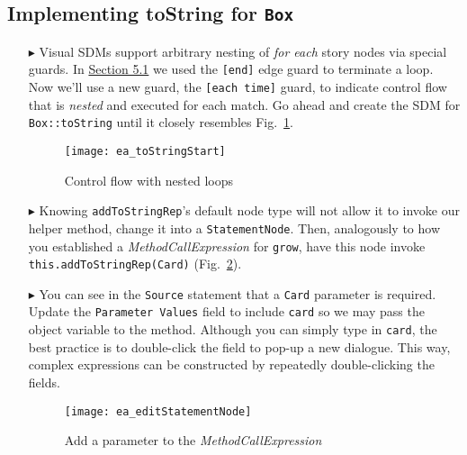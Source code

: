 \newpage
\hypertarget{stringRep vis}{}
\subsection{Implementing toString for \texttt{Box}}
\visHeader

\begin{itemize}

\item[$\blacktriangleright$] Visual SDMs support arbitrary nesting of \emph{for each} story nodes via special guards. In \hyperlink{emptyPartition vis}{Section
5.1} we used the \texttt{[end]} edge guard to terminate a loop. Now we'll use a new guard, the \texttt{[each time]} guard, to indicate control flow that is \emph{nested} and
executed for each match. Go ahead and create the SDM for \texttt{Box::toString} until it closely resembles Fig.~\ref{ea:sdm_tostring_1}. 

\begin{figure}[htbp]
\begin{center}
  \texttt{[image: ea\_toStringStart]}
  \caption{Control flow with nested loops} 
  \label{ea:sdm_tostring_1}
\end{center}
\end{figure}

\clearpage

\item[$\blacktriangleright$] Knowing \texttt{addToStringRep}'s default node type will not allow it to invoke our helper method, change it
into a \texttt{StatementNode}. Then, analogously to how you established a \emph{MethodCallExpression} for \texttt{grow}, have this node invoke
\texttt{this.addToStringRep(Card)} (Fig.~\ref{ea:editStatement}). 

\vspace{0.5cm}

\item[$\blacktriangleright$] You can see in the \texttt{Source} statement that a \texttt{Card} parameter is required. Update the \texttt{Parameter Values}
field to include \texttt{card} so we may pass the object variable to the method. Although you can simply type in \texttt{card}, the best practice is to
double-click the field to pop-up a new dialogue. This way, complex expressions can be constructed by repeatedly double-clicking the fields.

\vspace{0.5cm}

\begin{figure}[htbp]
\begin{center}
  \texttt{[image: ea\_editStatementNode]}
  \caption{Add a parameter to the \emph{MethodCallExpression}}
  \label{ea:editStatement}
\end{center}
\end{figure}


\end{itemize}
